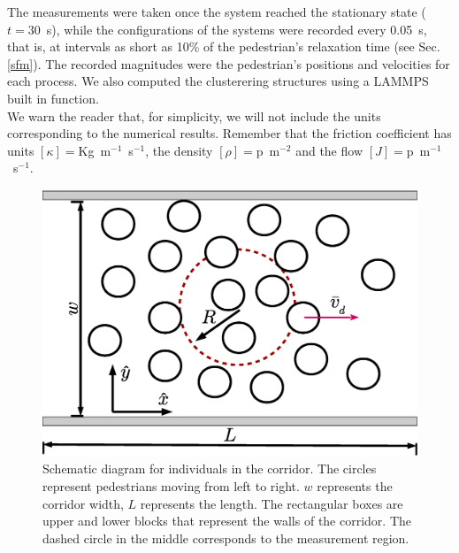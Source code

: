 The measurements were taken once the system reached the stationary state ($t=30$~s), while the configurations of the systems were recorded every 0.05~s, that is, at intervals as short as 10\% of the pedestrian’s relaxation time (see Sec. \ref{sfm}). The recorded magnitudes were the pedestrian’s positions and velocities for each process. We also computed the clusterering structures using a LAMMPS built in function.\\
  
We warn the reader that, for simplicity, we will not include the units corresponding to the numerical results. Remember that the friction coefficient has units $\left [ \kappa \right ]=$Kg~m$^{-1}$~s$^{-1}$, the density $\left [ \rho \right ]=$p~m$^{-2}$  and the flow  $\left [ J \right ]=$p~m$^{-1}$~s$^{-1}$.


\begin{figure}[htbp!]
\includegraphics[width=\columnwidth]
{./plots/corridor.eps}
\caption{\label{corridor} Schematic diagram for individuals in the corridor. 
The circles represent pedestrians moving from left to right. $w$ represents the corridor width, $L$ represents the length. The rectangular boxes are upper and lower blocks that represent the walls of the corridor. The dashed circle in the middle corresponds to the measurement region.}
\end{figure}
